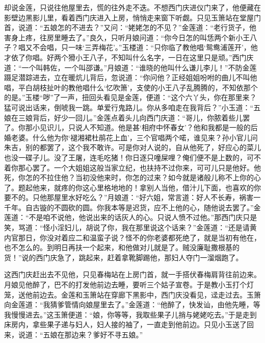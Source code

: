 却说金莲，只说往他屋里去，慌的往外走不迭。不想西门庆进仪门来了，他便藏在影壁边黑影儿里，看着西门庆进入上房，悄悄走来窗下听觑。只见玉箫站在堂屋门首，说道：“五娘怎的不进去？”又问：“姥姥怎的不见？”金莲道：“老行货子，他害身上疼，往房里睡去了。”良久，只听月娘问道：“你今日怎的叫恁两个新小王八子？唱又不会唱，只一味‘三弄梅花’。”玉楼道：“只你临了教他唱‘鸳鸯浦莲开’，他才依了你唱。好两个猾小王八子，不知叫什么名字，一日在这里只是顽。”西门庆道：“一个叫韩佐，一个叫邵谦。”月娘道：“谁晓的他叫什么谦儿李儿！”不防金莲蹑足潜踪进去，立在暖炕儿背后，忽说道：“你问他？正经姐姐吩咐的曲儿不叫他唱，平白胡枝扯叶的教他唱什么‘忆吹箫’，支使的小王八子乱腾腾的，不知依那个的是。”玉楼“哕”了一声，扭回头看见是金莲，便道：“这个六丫头，你在那里来？猛可说出话来，倒唬我一跳。单爱行鬼路儿。你从多咱走在我背后？”小玉道：“五娘在三娘背后，好少一回儿。”金莲点着头儿向西门庆道：“哥儿，你脓着些儿罢了。你那小见识儿，只说人不知道。他是甚‘相府中怀春女’？他和我都是一般的后婚老婆。什么他为你‘褪湘裙杜鹃花上血’，三个官唱两个喏，谁见来？孙小官儿问朱吉，别的都罢了，这个我不敢许。可是你对人说的，自从他死了，好应心的菜儿也没一碟子儿。没了王屠，连毛吃猪！你日逐只噇屎哩？俺们便不是上数的，可不着你那心罢了。一个大姐姐这般当家立纪，也扶持不过你来，可可儿只是他好。他死，你怎的不拉住他？当初没他来时，你怎的过来？如今就是诸般儿称不上你的心了。题起他来，就疼的你这心里格地地的！拿别人当他，借汁儿下面，也喜欢的你要不的。只他那屋里水好吃么？”月娘道：“好六姐，常言道：好人不长寿，祸害一千年。自古镟的不圆砍的圆。你我本等是迟货，应不上他的心，随他说去罢了。”金莲道：“不是咱不说他，他说出来的话灰人的心。只说人愤不过他。”那西门庆只是笑，骂道：“怪小淫妇儿，胡说了你，我在那里说这个话来？”金莲道：“还是请黄内官那日，你没对着应二和温蛮子说？怪不的你老婆都死绝了，就是当初有他在，也不怎么的。到明日再扶一个起来，和他做对儿就是了。贼没廉耻撒根基的货！”说的西门庆急了，跳起来，赶着拿靴脚踢他，那妇人夺门一溜烟跑了。

这西门庆赶出去不见他，只见春梅站在上房门首，就一手搭伏春梅肩背往前边来。月娘见他醉了，巴不的打发他前边去睡，要听三个姑子宣卷。于是教小玉打个灯笼，送他前边去。金莲和玉箫站在穿廊下黑影中，西门庆没看见，迳走过去。玉箫向金莲道：“我猜爹管情向娘屋里去了。”金莲道：“他醉了，快发讪，由他先睡，等我慢慢进去。”这玉箫便道：“娘，你等等，我取些果子儿捎与姥姥吃去。”于是走到床房内，拿些果子递与妇人，妇人接的袖了，一直走到他前边。只见小玉送了回来，说道：“五娘在那边来？爹好不寻五娘。”

